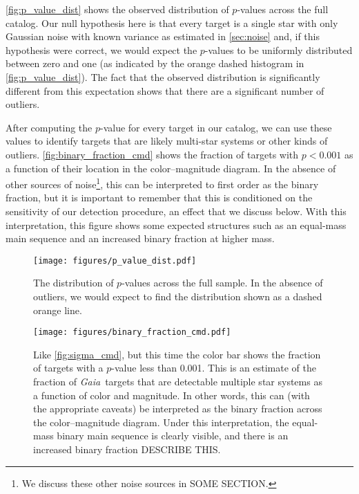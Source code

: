 \documentclass[modern, letterpaper]{aastex631}
\newcommand{\project}[1]{\textsl{#1}}
\newcommand{\Gaia}{\project{Gaia}}
\begin{document}
\autoref{fig:p_value_dist} shows the observed distribution of $p$-values across the full catalog.
Our null hypothesis here is that every target is a single star with only Gaussian noise with known variance as estimated in \autoref{sec:noise} and, if this hypothesis were correct, we would expect the $p$-values to be uniformly distributed between zero and one (as indicated by the orange dashed histogram in \autoref{fig:p_value_dist}).
The fact that the observed distribution is significantly different from this expectation shows that there are a significant number of outliers.

After computing the $p$-value for every target in our catalog, we can use these values to identify targets that are likely multi-star systems or other kinds of outliers.
\autoref{fig:binary_fraction_cmd} shows the fraction of targets with $p < 0.001$ as a function of their location in the color--magnitude diagram.
In the absence of other sources of noise\footnote{We discuss these other noise sources in SOME SECTION.}, this can be interpreted to first order as the binary fraction, but it is important to remember that this is conditioned on the sensitivity of our detection procedure, an effect that we discuss below.
With this interpretation, this figure shows some expected structures such as an equal-mass main sequence and an increased binary fraction at higher mass.

\begin{figure}
	\begin{centering}
		\texttt{[image: figures/p\_value\_dist.pdf]}
		\caption{The distribution of $p$-values across the full sample. In the absence of outliers, we would expect to find the distribution shown as a dashed orange line.}
		\label{fig:p_value_dist}
	\end{centering}
\end{figure}

\begin{figure}
	\begin{centering}
		\texttt{[image: figures/binary\_fraction\_cmd.pdf]}
		\caption{Like \autoref{fig:sigma_cmd}, but this time the color bar shows the fraction of targets with a $p$-value less than 0.001. This is an estimate of the fraction of \Gaia\ targets that are detectable multiple star systems as a function of color and magnitude. In other words, this can (with the appropriate caveats) be interpreted as the binary fraction across the color--magnitude diagram. Under this interpretation, the equal-mass binary main sequence is clearly visible, and there is an increased binary fraction DESCRIBE THIS.}
		\label{fig:binary_fraction_cmd}
	\end{centering}
\end{figure}
\end{document}
